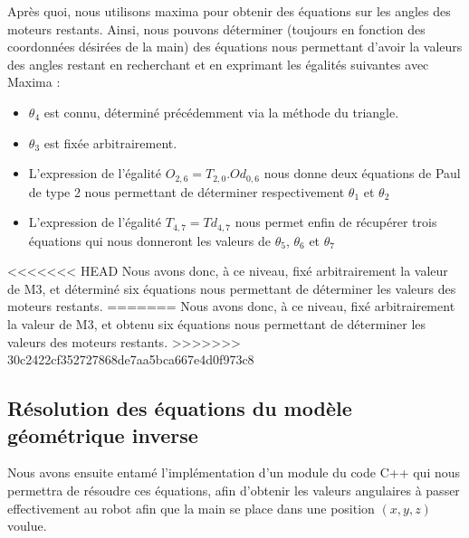 Après quoi, nous utilisons maxima pour obtenir des équations sur les angles des moteurs restants. Ainsi, nous pouvons déterminer (toujours en fonction des coordonnées désirées de la main) des équations nous permettant d'avoir la valeurs des angles restant en recherchant et en exprimant les égalités suivantes avec Maxima :\\

\begin{itemize}
\item $\theta_4$ est connu, déterminé précédemment via la méthode du triangle.
\item $\theta_3$ est fixée arbitrairement.
\item L'expression de l'égalité $O_{2, 6} = T_{2, 0} . Od_{0, 6}$ nous donne deux équations de Paul de type 2 nous permettant de déterminer respectivement $\theta_1$ et  $\theta_2$
\item L'expression de l'égalité $T_{4, 7} = Td_{4, 7}$ nous permet enfin de récupérer trois équations qui nous donneront les valeurs de $\theta_5$, $\theta_6$ et $\theta_7$\\

\end{itemize}

<<<<<<< HEAD
Nous avons donc, à ce niveau, fixé arbitrairement la valeur de M3, et déterminé six équations nous permettant de déterminer les valeurs des moteurs restants.
=======
Nous avons donc, à ce niveau, fixé arbitrairement la valeur de M3, et obtenu six équations nous permettant de déterminer les valeurs des moteurs restants.
>>>>>>> 30c2422cf352727868de7aa5bca667e4d0f973c8

\subsection{Résolution des équations du modèle géométrique inverse}

Nous avons ensuite entamé l'implémentation d'un module du code C++ qui nous permettra de résoudre ces équations, afin d'obtenir les valeurs angulaires à passer effectivement au robot afin que la main se place dans une position $(x, y, z)$ voulue.\\

